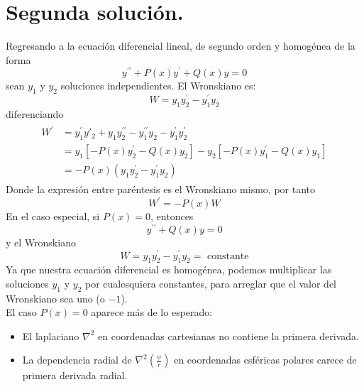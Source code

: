 \section{Segunda solución.}
Regresando a la ecuación diferencial lineal, de segundo orden y homogénea de la forma
\begin{equation}
y^{\prime \prime} + P(x) y^{\prime} + Q(x) y = 0
\label{eq:ecuacion_09_118}
\end{equation}
sean $y_{1}$ y $y_{2}$ soluciones independientes. El Wronskiano es:
\begin{equation}
W = y_{1} y^{\prime}_{2} - y^{\prime}_{1} y_{2}
\label{eq:ecuacion_09_119}
\end{equation}
diferenciando
\begin{eqnarray}
\begin{aligned}
W^{\prime} &= y^{\prime}_{1} y'_{2} + y_{1} y^{\prime \prime}_{2} - y^{\prime \prime}_{1} y_{2} - y^{\prime}_{1} y^{\prime}_{2} \\
&= y_{1} [ - P(x) y^{\prime}_{2} - Q(x) y_{2}] - y_{2} [ - P(x) y^{\prime}_{1} - Q(x) y_{1}] \\
&= - P(x) (y_{1} y^{\prime}_{2} - y^{\prime}_{1} y_{2})
\end{aligned}
\end{eqnarray}
Donde la expresión entre paréntesis es el Wronskiano mismo, por tanto
\begin{equation}
W^{\prime} = - P(x) W
\label{eq:ecuacion_09_120}
\end{equation}
En el caso especial, si $P(x)=0$, entonces
\begin{equation}
y^{\prime \prime} + Q(x) y = 0
\label{eq:ecuacion_09_121}
\end{equation}
y el Wronskiano
\begin{equation}
W = y_{1} y^{\prime}_{2} - y^{\prime}_{1} y_{2} = \mbox{ constante}
\label{eq:ecuacion_09_1202}
\end{equation}
Ya que nuestra ecuación diferencial es homogénea, podemos multiplicar las soluciones $y_{1}$ y $y_{2}$ por cualesquiera constantes, para arreglar que el valor del Wronskiano sea uno (o $-1$).
\\
El caso $P(x)=0$ aparece más de lo esperado:
\begin{itemize}
\item El laplaciano $\nabla^{2}$ en coordenadas cartesianas no contiene la primera derivada.
\item La dependencia radial de $\nabla^{2} (\frac{\psi}{r})$ en coordenadas esféricas polares carece de primera derivada radial.
\end{itemize}

